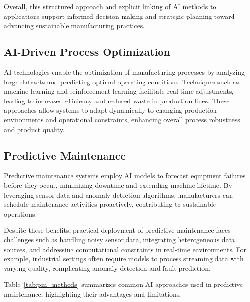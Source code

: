 \documentclass[sigconf]{acmart}
\begin{document}
Overall, this structured approach and explicit linking of AI methods to applications support informed decision-making and strategic planning toward advancing sustainable manufacturing practices.

\subsection{AI-Driven Process Optimization}
AI technologies enable the optimization of manufacturing processes by analyzing large datasets and predicting optimal operating conditions. Techniques such as machine learning and reinforcement learning facilitate real-time adjustments, leading to increased efficiency and reduced waste in production lines. These approaches allow systems to adapt dynamically to changing production environments and operational constraints, enhancing overall process robustness and product quality.

\subsection{Predictive Maintenance}
Predictive maintenance systems employ AI models to forecast equipment failures before they occur, minimizing downtime and extending machine lifetime. By leveraging sensor data and anomaly detection algorithms, manufacturers can schedule maintenance activities proactively, contributing to sustainable operations.

Despite these benefits, practical deployment of predictive maintenance faces challenges such as handling noisy sensor data, integrating heterogeneous data sources, and addressing computational constraints in real-time environments. For example, industrial settings often require models to process streaming data with varying quality, complicating anomaly detection and fault prediction.

Table~\ref{tab:pm_methods} summarizes common AI approaches used in predictive maintenance, highlighting their advantages and limitations.
\end{document}
